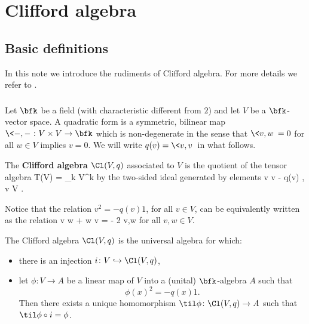\documentclass[../main.tex]{subfiles}
\begin{document}
 


\chapter*{Clifford algebra}

\section{Basic definitions}

In this note we introduce the rudiments of Clifford algebra.
For more details we refer to \cite[Chapter I]{spin}.

\subsection{}

Let $\bfk$ be a field (with characteristic different from $2$) and let $V$ be a $\bfk$-vector space.
A quadratic form is a symmetric, bilinear map $\<-,-\> \colon V \times V \to \bfk$ which is non-degenerate in the sense that $\<v,w\> = 0$ for all $w \in V$ implies $v = 0$.
We will write $q(v) = \<v,v\>$ in what follows.

The \textbf{Clifford algebra} $\Cl(V,q)$ associated to $V$ is the quotient of the tensor algebra
\beqn
T(V) = \oplus_{k } V^{\otimes k} 
\eeqn
by the two-sided ideal generated by elements
\beqn
v \otimes v - q(v)  \; , \quad v \in V .
\eeqn

Notice that the relation $v^2 = - q(v) 1$, for all $v \in V$, can be equivalently written as the relation
\beqn
v \cdot w + w \cdot v = - 2 \<v,w 
\eeqn
for all $v,w \in V$.

\begin{prop} The Clifford algebra $\Cl(V,q)$ is the universal algebra for which:
\begin{itemize}
\item there is an injection $i \colon V \hookrightarrow \Cl(V,q)$,
\item let $\phi \colon V \to A$ be a linear map of $V$ into a (unital) $\bfk$-algebra $A$ such that 
\[
\phi(x)^2 = - q(x) 1.
\]
Then there exists a unique homomorphism $\til \phi \colon \Cl(V,q) \to A$ such that $\til \phi \circ i = \phi$.
\end{itemize}
\end{prop}
\end{document}
